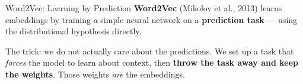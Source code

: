 \documentclass[aspectratio=169]{beamer}
\begin{document}
\begin{frame}{Word2Vec: Learning by Prediction}
\vspace{0.2cm}
{\small \textbf{Word2Vec} (Mikolov et al., 2013) learns embeddings by training a simple neural
network on a \textbf{prediction task} --- using the distributional hypothesis directly.}

\bigskip
{\small The trick: we do not actually care about the predictions. We set up a task that
\emph{forces} the model to learn about context, then \textbf{throw the task away and keep the
weights}. Those weights \emph{are} the embeddings.}

\medskip
{}
\end{frame}
\end{document}
